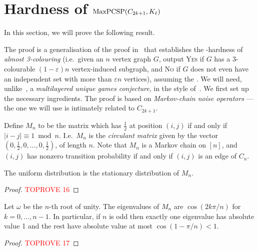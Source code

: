 \documentclass[a4paper,11pt, DIV=11]{scrartcl}
\renewcommand{\epsilon}{\varepsilon}
\DeclareMathOperator{\maxPCSP}{\textup{MaxPCSP}}
\theoremstyle{plain}
\theoremstyle{definition}
\begin{document}
\section{\texorpdfstring{Hardness of $\maxPCSP(C_{2k+1}, K_\ell)$}{Hardness of maxPCSP(C2k+1, Kl)}}
\label{sec:ugchardness}

In this section, we will prove the following result.

\thmUGChardness*

The proof is a generalisation of the proof
in~\cite{Dinur09:sicomp} that establishes the \NP-hardness of \emph{almost
3-colouring} (i.e.~given an $n$ vertex graph $G$, output \textsc{Yes} if $G$ has
a 3-colourable $(1 - \epsilon)n$ vertex-induced subgraph, and \textsc{No} if $G$
does not even have an independent set with more than $\epsilon n$ vertices), assuming the \UGC.
We will need, unlike~\cite{Dinur09:sicomp}, a
\emph{multilayered unique games conjecture}, in the style of~\cite{BWZ21}. We
first set up the necessary ingredients. The proof is based on \emph{Markov-chain noise operators} --- the one we will use is intimately related to $C_{2k + 1}$.

\begin{definition}
    Define $M_{n}$ to be the matrix which has $\frac{1}{2}$ at position $(i, j)$ if and only if $|i - j| \equiv 1 \bmod n$. I.e.~$M_{n}$ is the \emph{circulant matrix} given by the vector $(0, \frac{1}{2}, 0, \ldots, 0, \frac{1}{2})$, of length $n$. Note that $M_{n}$ is a Markov chain on $[n]$, and $(i, j)$ has nonzero transition probability if and only if $(i, j)$ is an edge of $C_{n}$.
\end{definition}

\begin{lemma}
    The uniform distribution is the stationary distribution of $M_{n}$.
\end{lemma}
\begin{proof}\textcolor{red}{TOPROVE 16}\end{proof}

\begin{lemma}
    Let $\omega$ be the $n$-th root of unity. The eigenvalues of $M_{n}$ are $\cos(2k\pi / n)$ for $k = 0, \ldots, n - 1$. In particular, if $n$ is odd then exactly one eigenvalue has absolute value 1 and the rest have absolute value at most $\cos(1 - \pi/n) < 1$.\footnotemark
\end{lemma}
\begin{proof}\textcolor{red}{TOPROVE 17}\end{proof}
\end{document}
